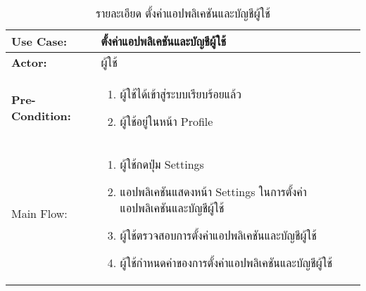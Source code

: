 \begin{table}
    \caption{รายละเอียด ตั้งค่าแอปพลิเคชันและบัญชีผู้ใช้}
    \begin{tabularx}{\textwidth}{ | >{\centering\bf} p{3cm} | X |}
        \hline
        Use Case: & ตั้งค่าแอปพลิเคชันและบัญชีผู้ใช้ \\\hline
        Actor: & ผู้ใช้ \\\hline
        Pre-Condition: &
        \begin{enumerate}[table]
            \item ผู้ใช้ได้เข้าสู่ระบบเรียบร้อยแล้ว
            \item ผู้ใช้อยู่ในหน้า Profile            
        \end{enumerate} \\\hline
        
        Main Flow: & 
        \begin{enumerate}[table]
            \item ผู้ใช้กดปุ่ม Settings
            \item แอปพลิเคชันแสดงหน้า Settings ในการตั้งค่าแอปพลิเคชันและบัญชีผู้ใช้
            \item ผู้ใช้ตรวจสอบการตั้งค่าแอปพลิเคชันและบัญชีผู้ใช้
            \item ผู้ใช้กำหนดค่าของการตั้งค่าแอปพลิเคชันและบัญชีผู้ใช้            
        \end{enumerate}\\\hline
    \end{tabularx}
\end{table}
\clearpage